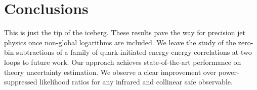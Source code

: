 \section{Conclusions}\label{sec:conclusions}

This is just the tip of the iceberg. These results pave the way for
precision jet physics once non-global logarithms are included. We leave
the study of the zero-bin subtractions of a family of quark-initiated
energy-energy correlations at two loops to future work. Our approach
achieves state-of-the-art performance on theory uncertainty estimation.
We observe a clear improvement over power-suppressed likelihood ratios
for any infrared and collinear safe observable.

